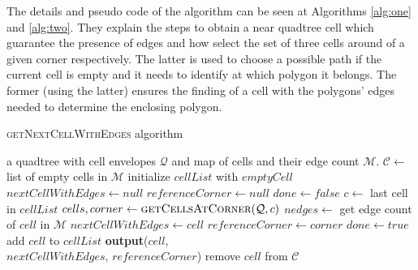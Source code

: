 The details and pseudo code of the algorithm can be seen at Algorithms \ref{alg:one} and \ref{alg:two}.  They explain the steps to obtain a near quadtree cell which guarantee the presence of edges and how select the set of three cells around of a given corner respectively.  The latter is used to choose a possible path if the current cell is empty and it needs to identify at which polygon it belongs.  The former (using the latter) ensures the finding of a cell with the polygons' edges needed to determine the enclosing polygon.

\begin{algorithm}\caption{\textsc{getNextCellWithEdges} algorithm}\label{alg:one}
    \begin{algorithmic}[1]
    \Require a quadtree with cell envelopes $\mathcal Q$ and map of cells and their edge count $\mathcal M$.
        \State $\mathcal C \gets $ list of empty cells in $\mathcal M$
            \State initialize $cellList$ with $emptyCell$ 
            \State $nextCellWithEdges \gets null$
            \State $referenceCorner \gets null$
            \State $done \gets false$
                \State $c \gets $ last cell in $cellList$ 
                \State $cells, corner \gets \textsc{getCellsAtCorner}(\mathcal Q, c)$ 
                    \State $nedges \gets$ get edge count of $cell$ in $\mathcal M$ 
                        \State $nextCellWithEdges \gets cell$
                        \State $referenceCorner \gets corner$
                        \State $done \gets true$
                    \Else
                        \State add $cell$ to $cellList$
                    \EndIf
                \EndFor
            \EndWhile
                \State \textbf{output}($cell$, \\
                \hspace{2.5cm} $nextCellWithEdges$, $referenceCorner$)
                \State remove $cell$ from $\mathcal C$
            \EndFor
        \EndFor
    \EndFunction
    \end{algorithmic}
\end{algorithm}


